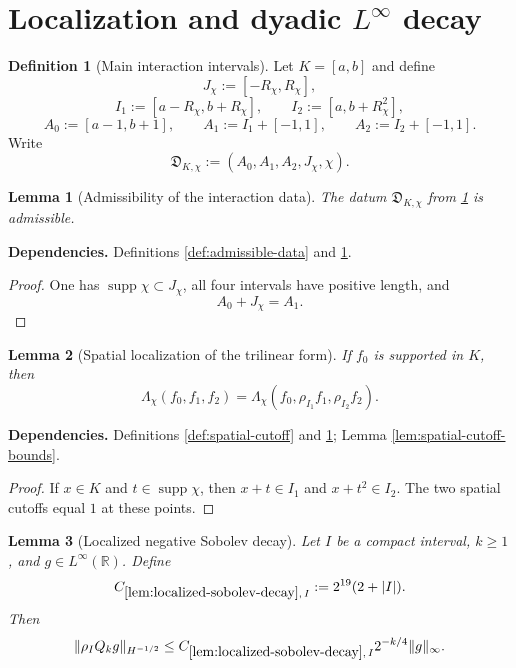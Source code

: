\documentclass[11pt]{article}
\newtheorem{lemma}[lemma]{Lemma}
\theoremstyle{definition}
\newtheorem{definition}[definition]{Definition}
\theoremstyle{remark}
\newcommand{\R}{\mathbb R}
\newcommand{\supp}{\operatorname{supp}}
\newcommand{\1}{\mathbf 1}
\newcommand{\Lamchi}{\Lambda_{\chi}}
\newcommand{\hNorm}[2]{\lVert #1\rVert_{H^{#2}}}
\newcommand{\lpNorm}[2]{\lVert #1\rVert_{#2}}
\newcommand{\uses}[1]{\par\smallskip\noindent\textbf{Dependencies.} #1\par\smallskip}
\begin{document}
\section{Localization and dyadic \texorpdfstring{$L^\infty$}{L-infinity} decay}

\begin{definition}[Main interaction intervals]\label{def:main-interaction-data}
Let $K=[a,b]$ and define
\[
J_\chi:=[-R_\chi,R_\chi],
\]
\[
I_1:=[a-R_\chi,b+R_\chi],
\qquad
I_2:=[a,b+R_\chi^2],
\]
\[
A_0:=[a-1,b+1],
\qquad
A_1:=I_1+[-1,1],
\qquad
A_2:=I_2+[-1,1].
\]
Write
\[
\mathfrak D_{K,\chi}:=(A_0,A_1,A_2,J_\chi,\chi).
\]
\end{definition}

\begin{lemma}[Admissibility of the interaction data]\label{lem:main-interaction-admissible}
The datum $\mathfrak D_{K,\chi}$ from \cref{def:main-interaction-data} is admissible.
\end{lemma}

\uses{Definitions \ref{def:admissible-data} and \ref{def:main-interaction-data}.}

\begin{proof}
One has $\supp\chi\subset J_\chi$, all four intervals have positive length, and
\[
A_0+J_\chi=A_1.
\]
\end{proof}

\begin{lemma}[Spatial localization of the trilinear form]\label{lem:trilinear-localization}
If $f_0$ is supported in $K$, then
\[
\Lamchi(f_0,f_1,f_2)
=
\Lamchi(f_0,\rho_{I_1}f_1,\rho_{I_2}f_2).
\]
\end{lemma}

\uses{Definitions \ref{def:spatial-cutoff} and \ref{def:main-interaction-data}; Lemma \ref{lem:spatial-cutoff-bounds}.}

\begin{proof}
If $x\in K$ and $t\in\supp\chi$, then
$x+t\in I_1$ and $x+t^2\in I_2$.  The two spatial cutoffs equal $1$ at these points.
\end{proof}

\begin{lemma}[Localized negative Sobolev decay]\label{lem:localized-sobolev-decay}
Let $I$ be a compact interval, $k\geq1$, and $g\in L^\infty(\R)$.  Define
\[
C_{\ref{lem:localized-sobolev-decay},\,I}
:=
2^{19}(2+\lvert I\rvert).
\]
Then
\[
\hNorm{\rho_IQ_kg}{-1/2}
\leq
C_{\ref{lem:localized-sobolev-decay},\,I}
2^{-k/4}\lpNorm g\infty.
\]
\end{lemma}
\end{document}
